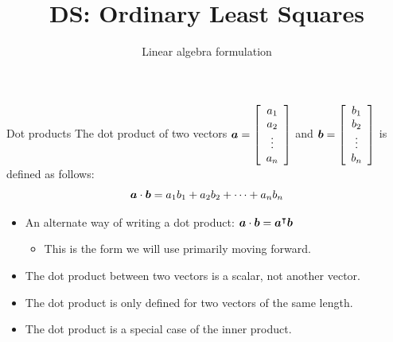 \documentclass[aspectratio=169]{../latex_main/tntbeamer}  %
\title[Regression]{DS: Ordinary Least Squares}
\subtitle{Linear algebra formulation}
\begin{document}
	
	\maketitle
	\begin{frame}{Dot products}
	    The dot product of two vectors 		$\bm{a} = \left[\begin{array}{c}
	          a_1 \\
	          a_2 \\
	          \vdots\\
	          a_n
	    \end{array}\right]$	       and	$\bm{b} = \left[\begin{array}{c}
	          b_1 \\
	          b_2 \\
	          \vdots\\
	          b_n
	    \end{array}\right]$			   is defined as follows: 
	    \begin{equation*}
	        \bm{a} \cdot \bm{b} = a_1b_1 + a_2b_2 + \dots + a_nb_n
	    \end{equation*}
	   
    \begin{itemize}
        \item An alternate way of writing a dot product: $\bm{a}\cdot \bm{b} = \bm{a}^\intercal \bm{b}$
        \begin{itemize}
            \item This is the form we will use primarily moving forward.
        \end{itemize}
            \item The dot product between two vectors is a scalar, not another vector.
            \item The dot product is only defined for two vectors of the same length.  
            \item The dot product is a special case of the inner product.
    \end{itemize}

	\end{frame}
	
\end{document}
